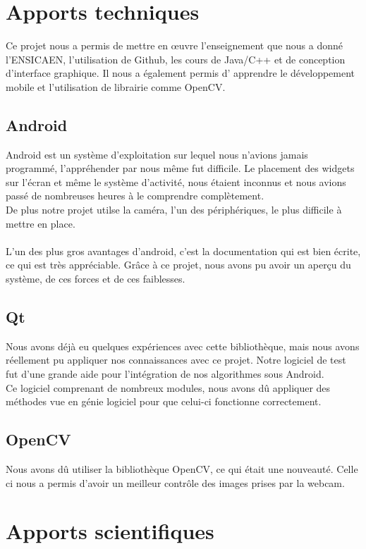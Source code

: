 \section{Apports techniques}

Ce projet nous a permis de mettre en œuvre l'enseignement que nous a donné l'ENSICAEN, l'utilisation de Github, les cours de Java/C++ et de conception d'interface graphique. Il nous a également permis d'
apprendre le développement mobile et l'utilisation de librairie comme OpenCV\@.

\subsection{Android}
	Android est un système d'exploitation sur lequel nous n'avions jamais programmé, l'appréhender par nous même fut difficile.
	Le placement des widgets sur l'écran et même le système d'activité, nous étaient inconnus et nous avions passé de nombreuses heures à le comprendre complètement.\\
	De plus notre projet utilse la caméra, l'un des périphériques, le plus difficile à mettre en place.\\\\

	L'un des plus gros avantages d'android, c'est la documentation qui est bien écrite, ce qui est très appréciable. Grâce à ce projet, nous avons pu avoir un aperçu du système, de ces forces et
	de ces faiblesses.

\subsection{Qt}
	Nous avons déjà eu quelques expériences avec cette bibliothèque, mais nous avons réellement pu appliquer nos connaissances avec ce projet.
	Notre logiciel de test fut d'une grande aide pour l'intégration de nos algorithmes sous Android.\\
	Ce logiciel comprenant de nombreux modules, nous avons dû appliquer des méthodes vue en génie logiciel pour que celui-ci fonctionne correctement.

\subsection{OpenCV}
Nous avons dû utiliser la bibliothèque OpenCV, ce qui était une nouveauté. Celle ci nous a permis d'avoir un meilleur contrôle des images prises par la webcam.

\section{Apports scientifiques}

